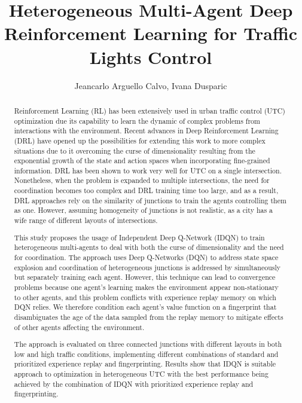\documentclass{llncs}
\title{Heterogeneous Multi-Agent Deep Reinforcement Learning for Traffic Lights Control}
\author{Jeancarlo Arguello Calvo, Ivana Dusparic}
\institute{School of Computer Science and Statistics, University of Dublin, Trinity College \\
\email{arguellj@tcd.ie, ivana.dusparic@scss.tcd.ie} }
\begin{document}
\maketitle

\begin{abstract}

Reinforcement Learning (RL) has been extensively used in urban traffic control (UTC) optimization due its capability to learn the dynamic of complex problems from interactions with the environment. Recent advances in Deep Reinforcement Learning (DRL) have opened up the possibilities for extending this work to more complex situations due to it overcoming the curse of dimensionality resulting from the exponential growth of the state and action spaces when incorporating fine-grained information. DRL has been shown to work very well for UTC on a single intersection. Nonetheless, when the problem is expanded to multiple intersections, the need for coordination becomes too complex and DRL training time too large, and as a result, DRL approaches rely on the similarity of junctions to train the agents controlling them as one. However, assuming homogeneity of junctions is not realistic, as a city has a wife range of different layouts of intersections.

This study proposes the usage of Independent Deep Q-Network (IDQN) to train heterogeneous multi-agents to deal with both the curse of dimensionality and the need for coordination. The approach uses Deep Q-Networks (DQN) to address state space explosion and coordination of heterogeneous junctions is addressed by simultaneously but separately training each agent. However, this technique can lead to convergence problems because one agent's learning makes the environment appear non-stationary to other agents, and this problem conflicts with experience replay memory on which DQN relies. We therefore condition each agent's value function on a fingerprint that disambiguates the age of the data sampled from the replay memory to mitigate effects of other agents affecting the environment. 

The approach is evaluated on three connected junctions with different layouts in both low and high traffic conditions, implementing different combinations of standard and prioritized experience replay and fingerprinting. Results show that IDQN is suitable approach to optimization in heterogeneous UTC with the best performance being achieved by the combination of IDQN with prioritized experience replay and fingerprinting.  


\end{abstract}
\end{document}
